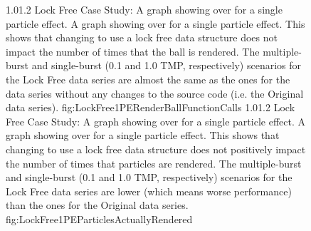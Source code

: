 \begin{figure}
\addtocounter{figure}{-1}

	\vspace{-1.5cm}
	{1.0}{1.2}
	{Lock Free Case Study: A graph showing  over  for a single particle effect.}
	{A graph showing  over  for a single particle effect. This shows that changing  to use a lock free data structure does not impact the number of times that the ball is rendered. The multiple-burst and single-burst (0.1 and 1.0 TMP, respectively) scenarios for the Lock Free data series are almost the same as the ones for the data series without any changes to the source code (i.e. the Original data series).}
	{fig:LockFree1PERenderBallFunctionCalls}
	\vspace{-1.5cm}
	{1.0}{1.2}
	{Lock Free Case Study: A graph showing  over  for a single particle effect.}
	{A graph showing  over  for a single particle effect. This shows that changing  to use a lock free data structure does not positively impact the number of times that particles are rendered. The multiple-burst and single-burst (0.1 and 1.0 TMP, respectively) scenarios for the Lock Free data series are lower (which means worse performance) than the ones for the Original data series.}
	{fig:LockFree1PEParticlesActuallyRendered}

\end{figure}

